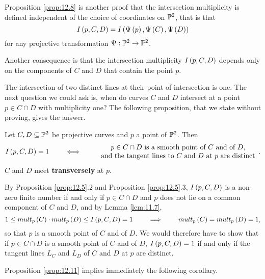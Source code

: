 \begin{remark}
Proposition \ref{prop:12.8} is another proof that the intersection multiplicity is defined independent of the choice of coordinates on $ \P^2 $, that is that
$$ I\rb{p, C, D} = I\rb{\Psi\rb{p}, \Psi\rb{C}, \Psi\rb{D}} $$
for any projective transformation $ \Psi : \P^2 \to \P^2 $.
\end{remark}

\begin{remark}
Another consequence is that the intersection multiplicity $ I\rb{p, C, D} $ depends only on the components of $ C $ and $ D $ that contain the point $ p $.
\end{remark}

The intersection of two distinct lines at their point of intersection is one. The next question we could ask is, when do curves $ C $ and $ D $ intersect at a point $ p \in C \cap D $ with multiplicity one? The following proposition, that we state without proving, gives the answer.

\begin{proposition}
\label{prop:12.11}
Let $ C, D \subseteq \P^2 $ be projective curves and $ p $ a point of $ \P^2 $. Then
$$ I\rb{p, C, D} = 1 \qquad \iff \qquad
\begin{array}{c}
p \in C \cap D \ \text{is a smooth point of} \ C \ \text{and of} \ D, \\
\text{and the tangent lines to} \ C \ \text{and} \ D \ \text{at} \ p \ \text{are distinct}
\end{array}.
$$
$ C $ and $ D $ meet \textbf{transversely} at $ p $.
\end{proposition}

\begin{remark}
By Proposition \ref{prop:12.5}.$ 2 $ and Proposition \ref{prop:12.5}.$ 3 $, $ I\rb{p, C, D} $ is a non-zero finite number if and only if $ p \in C \cap D $ and $ p $ does not lie on a common component of $ C $ and $ D $, and by Lemma \ref{lem:11.7},
$$ 1 \le mult_p\rb{C} \cdot mult_p\rb{D} \le I\rb{p, C, D} = 1 \qquad \implies \qquad mult_p\rb{C} = mult_p\rb{D} = 1, $$
so that $ p $ is a smooth point of $ C $ and of $ D $. We would therefore have to show that if $ p \in C \cap D $ is a smooth point of $ C $ and of $ D $, $ I\rb{p, C, D} = 1 $ if and only if the tangent lines $ L_C $ and $ L_D $ of $ C $ and $ D $ at $ p $ are distinct.
\end{remark}

Proposition \ref{prop:12.11} implies immediately the following corollary.

